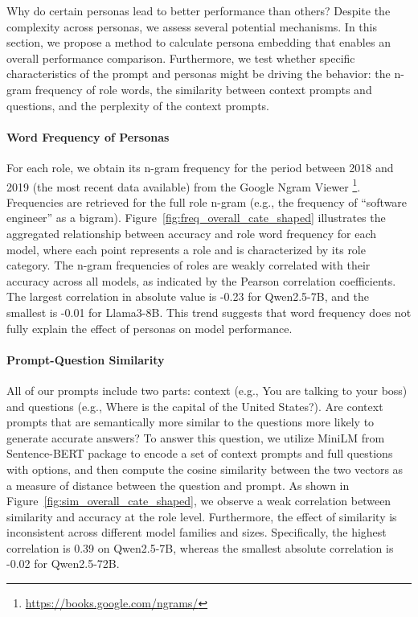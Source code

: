 \documentclass[11pt]{article}
\newcommand{\mz}[1]{\textcolor{orange}{\bf\small [#1 --MZ]}}
\begin{document}
Why do certain personas lead to better performance than others? Despite the complexity across personas, we assess several potential mechanisms. In this section, we propose a method to calculate persona embedding that enables an overall performance comparison. Furthermore, we test whether specific characteristics of the prompt and personas might be driving the behavior: the n-gram frequency of role words, the similarity between context prompts and questions, and the perplexity of the context prompts.


\paragraph{Word Frequency of Personas}

For each role, we obtain its n-gram frequency for the period between 2018 and 2019 (the most recent data available) from the Google Ngram Viewer \footnote{\url{https://books.google.com/ngrams/}}. Frequencies are retrieved for the full role n-gram (e.g., the frequency of ``software engineer'' as a bigram). Figure~\ref{fig:freq_overall_cate_shaped} illustrates the aggregated relationship between accuracy and role word frequency for each model, where each point represents a role and is characterized by its role category. The n-gram frequencies of roles are weakly correlated with their accuracy across all models, as indicated by the Pearson correlation coefficients. The largest correlation in absolute value is -0.23 for Qwen2.5-7B, and the smallest is -0.01 for Llama3-8B. This trend suggests that word frequency does not fully explain the effect of personas on model performance. 

\paragraph{Prompt-Question Similarity} All of our prompts include two parts: context (e.g., You are talking to your boss) and questions (e.g., Where is the capital of the United States?). Are context prompts that are semantically more similar to the questions more likely to generate accurate answers? To answer this question, we utilize MiniLM \citep{wang2020minilm} from Sentence-BERT package \citep{reimers2019sentence} to encode a set of context prompts and full questions with options, and then compute the cosine similarity between the two vectors as a measure of distance between the question and prompt. As shown in Figure~\ref{fig:sim_overall_cate_shaped}, we observe a weak correlation between similarity and accuracy at the role level. Furthermore, the effect of similarity is inconsistent across different model families and sizes. Specifically, the highest correlation is 0.39 on Qwen2.5-7B, whereas the smallest absolute correlation is -0.02 for Qwen2.5-72B. 
\end{document}

